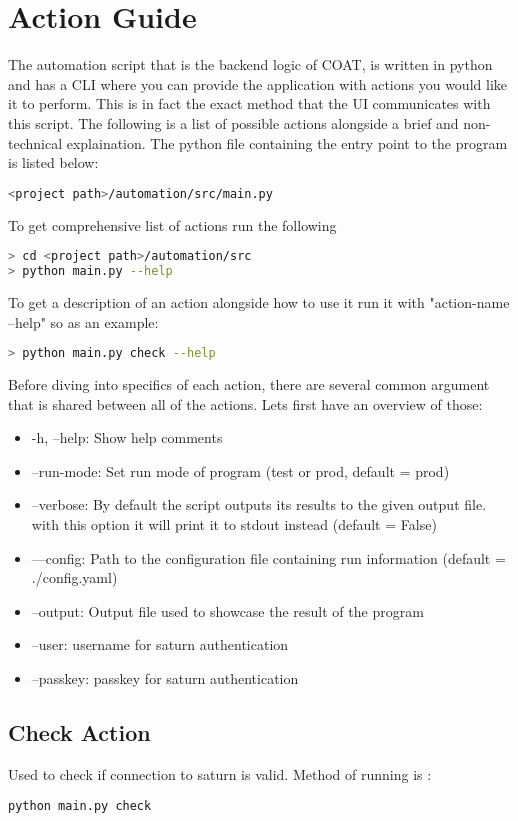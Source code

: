 \documentclass[12pt,a4paper]{article}
\begin{document}
\section{Action Guide}
The automation script that is the backend logic of COAT, is written
in python and has a CLI where you can provide the application with actions
you would like it to perform. This is in fact the exact method that the UI 
communicates with this script. The following is a list of possible actions
alongside a brief and non-technical explaination. The python file containing
the entry point to the program is listed below:
\begin{lstlisting}[language=bash]
<project path>/automation/src/main.py
\end{lstlisting}
To get comprehensive list of actions run the following
\begin{lstlisting}[language=bash]
> cd <project path>/automation/src
> python main.py --help
\end{lstlisting}
To get a description of an action alongside how to use it run it with "action-name --help"
so as an example:
\begin{lstlisting}[language=bash]
> python main.py check --help
\end{lstlisting}
Before diving into specifics of each action,  there are several common argument
that is shared between all of the actions. Lets first have an overview of those:
\begin{itemize}
  \item -h, --help: Show help comments
  \item --run-mode: Set run mode of program (test or prod, default = prod)
  \item --verbose: By default the script outputs its results to the given output file.
                   with this option it will print it to stdout instead (default = False)
  \item ---config: Path to the configuration file containing run information (default = ./config.yaml)
  \item --output: Output file used to showcase the result of the program
  \item --user: username for saturn authentication
  \item --passkey: passkey for saturn authentication 
\end{itemize}

\subsection{Check Action}
Used to check if connection to saturn is valid. Method of running is :
\begin{lstlisting}[]
  python main.py check
\end{lstlisting}
\end{document}
